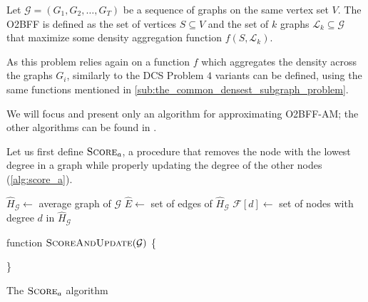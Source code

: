 Let $\mathcal{G} = (G_1, G_2, \dots, G_T) $ be a sequence of graphs on the same
vertex set $V$. The \acrfull{O2BFF} is defined as the set of
vertices $S \subseteq V$ and the set of $k$ graphs $\mathcal{L}_{k} \subseteq
	\mathcal{G}  $ that maximize some density aggregation function $f(S,
	\mathcal{L}_{k}) $.

As this problem relies again on a function $f$ which aggregates the density
across the graphs $G_i$, similarly to the \acrshort{DCS} Problem $4$ variants
can be defined, using the same functions mentioned in
\autoref{sub:the_common_densest_subgraph_problem}.

We will focus and present only an algorithm for approximating
\acrshort{O2BFF}-AM; the other algorithms can be found in
\cite{semertzidis2019finding}.

Let us first define $\textsc{Score}_{a}  $, a procedure that removes the node
with the lowest degree in a graph while properly updating the degree of the
other nodes (\autoref{alg:score_a}).

\begin{algorithm}
	\SetAlgoLined
	$\hat{H}_{\mathcal{G} } \leftarrow $ average graph of $\mathcal{G} $ \;
	$\hat{E} \leftarrow $ set of edges of $\hat{H}_{\mathcal{G} }  $ \;
	$\mathcal{F}[d] \leftarrow $ set of nodes with degree
	\footnotemark
	$d$ in $\hat{H}_{\mathcal{G} }  $\;

	\bigskip

	{function \textnormal{$\textsc{ScoreAndUpdate}( \mathcal{G} )$ \{ }}
	{}

	\}
	\caption{The $\textsc{Score}_{a}  $ algorithm}
	\label{alg:score_a}
\end{algorithm}


